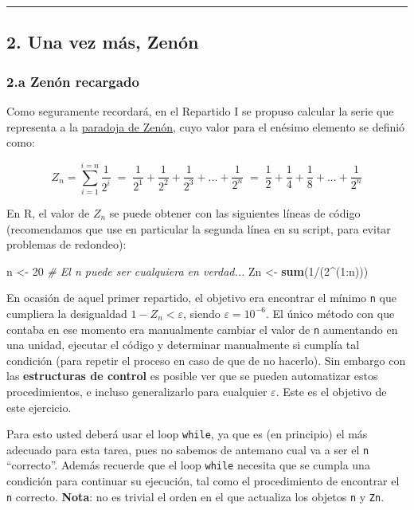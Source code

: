 \documentclass[]{article}
\newenvironment{Shaded}{}{}
\newcommand{\KeywordTok}[1]{\textcolor[rgb]{0.00,0.44,0.13}{\textbf{{#1}}}}
\newcommand{\DecValTok}[1]{\textcolor[rgb]{0.25,0.63,0.44}{{#1}}}
\newcommand{\CommentTok}[1]{\textcolor[rgb]{0.38,0.63,0.69}{\textit{{#1}}}}
\newcommand{\NormalTok}[1]{{#1}}
\begin{document}
\begin{center}\rule{3in}{0.4pt}\end{center}

\subsection{2. Una vez más, Zenón}

\subsubsection{2.a Zenón recargado}

Como seguramente recordará, en el Repartido I se propuso calcular la
serie que representa a la
\href{https://es.wikipedia.org/wiki/Paradojas\_de\_Zen\%C3\%B3n\#La\_dicotom.C3.ADa}{paradoja
de Zenón}, cuyo valor para el enésimo elemento se definió como:

\[
  Z_n = \sum_{i=1}^{i=n} \frac{1}{2 ^ i} \;=\;
  \frac{1}{2 ^ 1} + \frac{1}{2 ^ 2} + \frac{1}{2 ^ 3} + ... + \frac{1}{2 ^ n} \;=\;
  \frac{1}{2} + \frac{1}{4} + \frac{1}{8} + ... + \frac{1}{2 ^ n}
\]

En R, el valor de $Z_n$ se puede obtener con las siguientes líneas de
código (recomendamos que use en particular la segunda línea en su
script, para evitar problemas de redondeo):

\begin{Shaded}
\begin{Highlighting}[]
\NormalTok{n <- }\DecValTok{20}  \CommentTok{# El n puede ser cualquiera en verdad...}
\NormalTok{Zn <- }\KeywordTok{sum}\NormalTok{(}\DecValTok{1}\NormalTok{/(}\DecValTok{2}\NormalTok{^(}\DecValTok{1}\NormalTok{:n)))}
\end{Highlighting}
\end{Shaded}
En ocasión de aquel primer repartido, el objetivo era encontrar el
mínimo \texttt{n} que cumpliera la desigualdad $1 - Z_n < \varepsilon$,
siendo $\varepsilon = 10 ^ {-6}$. El único método con que contaba en ese
momento era manualmente cambiar el valor de \texttt{n} aumentando en una
unidad, ejecutar el código y determinar manualmente si cumplía tal
condición (para repetir el proceso en caso de que de no hacerlo). Sin
embargo con las \textbf{estructuras de control} es posible ver que se
pueden automatizar estos procedimientos, e incluso generalizarlo para
cualquier $\varepsilon$. Este es el objetivo de este ejercicio.

Para esto usted deberá usar el loop \texttt{while}, ya que es (en
principio) el más adecuado para esta tarea, pues no sabemos de antemano
cual va a ser el \texttt{n} ``correcto''. Además recuerde que el loop
\texttt{while} necesita que se cumpla una condición para continuar su
ejecución, tal como el procedimiento de encontrar el \texttt{n}
correcto. \textbf{Nota}: no es trivial el orden en el que actualiza los
objetos \texttt{n} y \texttt{Zn}.
\end{document}
